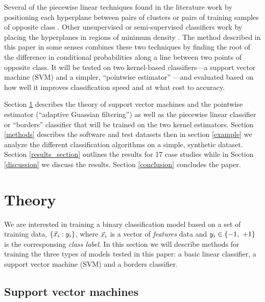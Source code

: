 Several of the piecewise linear techniques found in the literature work by
positioning each hyperplane between pairs of clusters or pairs of training
samples of opposite class 
\citep{Sklansky_Michelotti1980,Tenmoto_etal1998,Kostin2006,Gai_Zhang2010}.
Other unsupervised or semi-supervised classifiers work by placing the 
hyperplanes in regions of minimum density \citep{Pavlidis_etal2016}.
The method described in this paper in some senses combines these two techniques
by finding the root of the difference in conditional probabilities along a
line between two points of opposite class.
It will be tested on two kernel-based classifiers---a support vector
machine (SVM) \citep{Michie_etal1994,Mueller_etal2001}
and a simpler, ``pointwise estimator'' \citep{Terrell_Scott1992,Mills2011}---and evaluated based on how
well it improves classification speed and at what cost to accuracy.

Section \ref{theory} describes the theory of support
vector machines and the pointwise estimator (``adaptive Guassian filtering'')
as well as the piecewise linear classifier or ``borders'' classifier
that will be trained on the two kernel estimators.
Section \ref{methods} describes the software and test datasets then in
section \ref{example} we analyze the different classification algorithms on
a simple, synthetic dataset.
Section \ref{results_section} outlines the results for 17 case studies
while in Section \ref{discussion} we discuss the results.
Section \ref{conclusion} concludes the paper.

\section{Theory}

\label{theory}

We are interested in training a binary classification model based on a set of 
training data, $\lbrace \vec {x}_i: y_i \rbrace$, where $\vec {x}_i$
is a vector of {\it features} data and 
$y_i \in \lbrace -1,~ +1 \rbrace$ is the corresponsing
{\it class label}.
In this section we will describe methods for training the three types of
models tested in this paper: a basic linear classifier, a support vector
machine (SVM) and a borders classifier.

\subsection{Support vector machines}

